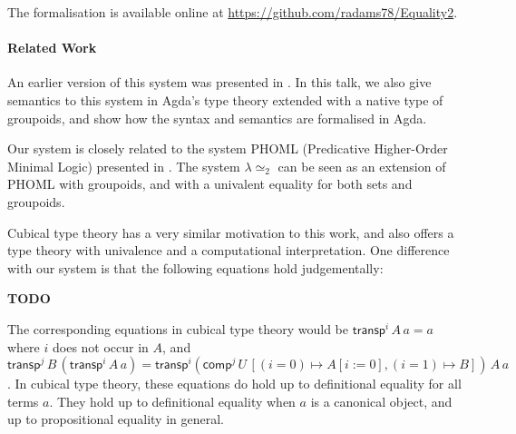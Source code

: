 \documentclass{easychair}
\newcommand{\LEtwo}{\ensuremath{\lambda \! \simeq_2}}
\begin{document}
The formalisation is available online at \url{https://github.com/radams78/Equality2}.

\paragraph{Related Work}

An earlier version of this system was presented in \cite{ap:tsnhu}.  In this talk, we also give semantics to this system in Agda's type theory extended with a native type of groupoids, and show how the syntax and semantics are formalised in Agda.

Our system is closely related to the system PHOML (Predicative Higher-Order Minimal Logic) presented in \cite{abc:ncrpehoml}.  The system $\LEtwo$ can be seen as an extension of PHOML with groupoids, and with a univalent equality for both sets and groupoids.

Cubical type theory \cite{cchm:cubical, huber:canonicity} has a very similar motivation to this work, and also offers a type theory with univalence and a computational interpretation.  One difference with our system is that the following equations hold judgementally:

\textbf{TODO}

The corresponding equations in cubical type theory would be $\mathsf{transp}^i \, A \, a = a$ where $i$ does not occur in $A$, and $\mathsf{transp}^j \, B \, (\mathsf{transp}^i \, A \, a) = \mathsf{transp}^i (\mathsf{comp}^j \, U \, [(i = 0) \mapsto A[i:=0], (i=1) \mapsto B]) \, A \, a$.  In cubical type theory, these equations do hold up to definitional equality for all terms $a$.  They hold up to definitional equality when $a$ is a canonical object, and up to propositional equality in general.


\end{document}
